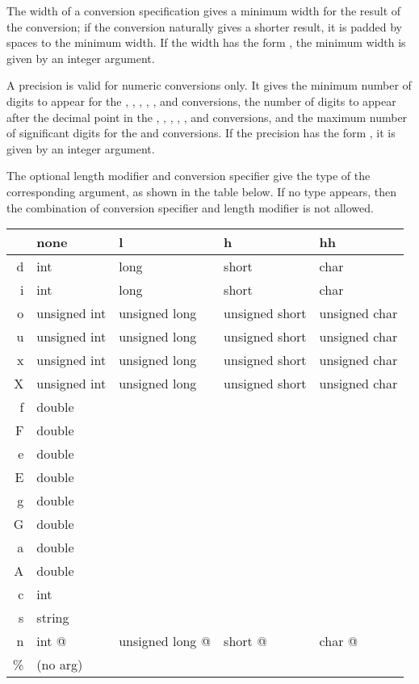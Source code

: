 The width of a conversion specification gives a minimum width for the
result of the conversion; if the conversion naturally gives a shorter
result, it is padded by spaces to the minimum width.  If the width has
the form \code{*}, the minimum width is given by an integer argument.

A precision is valid for numeric conversions only.  It gives the minimum
number of digits to appear for the , , ,
, , and  conversions, the number of digits to
appear after the decimal point in the , , ,
, , and  conversions, and the maximum number of
significant digits for the  and  conversions.  If the
precision has the form  \code{*}, it is given by an integer
argument.

The optional length modifier and conversion specifier give the type of
the corresponding argument, as shown in the table below.  If no type
appears, then the combination of conversion specifier and length
modifier is not allowed.

\begin{tt}
\begin{tabular}{r|llll}
  & none         & l             & h              & hh\\\hline
d & int          & long          & short          & char \\
i & int          & long          & short          & char \\
o & unsigned int & unsigned long & unsigned short & unsigned char \\
u & unsigned int & unsigned long & unsigned short & unsigned char \\
x & unsigned int & unsigned long & unsigned short & unsigned char \\
X & unsigned int & unsigned long & unsigned short & unsigned char \\
f & double \\
F & double \\
e & double \\
E & double \\
g & double \\
G & double \\
a & double \\
A & double \\
c & int \\
s & string \\
n & int @        & unsigned long @ & short @      & char @ \\
\% & \textrm{(no arg)}
\end{tabular}
\end{tt}

